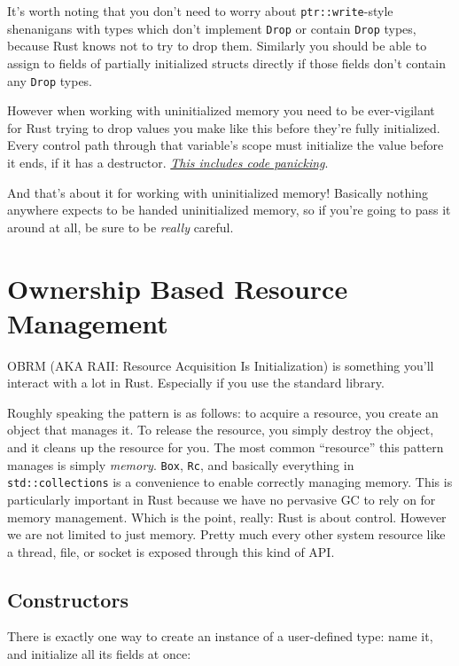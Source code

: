 \documentclass[a4paper,]{book}
\begin{document}
It's worth noting that you don't need to worry about
\texttt{ptr::write}-style shenanigans with types which don't implement
\texttt{Drop} or contain \texttt{Drop} types, because Rust knows not to
try to drop them. Similarly you should be able to assign to fields of
partially initialized structs directly if those fields don't contain any
\texttt{Drop} types.

However when working with uninitialized memory you need to be
ever-vigilant for Rust trying to drop values you make like this before
they're fully initialized. Every control path through that variable's
scope must initialize the value before it ends, if it has a destructor.
\emph{\protect\hyperlink{sec--unwinding}{This includes code panicking}}.

And that's about it for working with uninitialized memory! Basically
nothing anywhere expects to be handed uninitialized memory, so if you're
going to pass it around at all, be sure to be \emph{really} careful.

\chapter{Ownership Based Resource Management}\label{sec--obrm}

OBRM (AKA RAII: Resource Acquisition Is Initialization) is something
you'll interact with a lot in Rust. Especially if you use the standard
library.

Roughly speaking the pattern is as follows: to acquire a resource, you
create an object that manages it. To release the resource, you simply
destroy the object, and it cleans up the resource for you. The most
common ``resource'' this pattern manages is simply \emph{memory}.
\texttt{Box}, \texttt{Rc}, and basically everything in
\texttt{std::collections} is a convenience to enable correctly managing
memory. This is particularly important in Rust because we have no
pervasive GC to rely on for memory management. Which is the point,
really: Rust is about control. However we are not limited to just
memory. Pretty much every other system resource like a thread, file, or
socket is exposed through this kind of API.

\section{Constructors}\label{sec--constructors}

There is exactly one way to create an instance of a user-defined type:
name it, and initialize all its fields at once:
\end{document}
